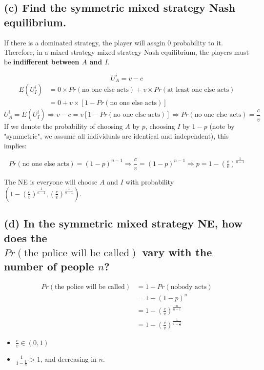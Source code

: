 \documentclass{article}
\begin{document}
\subsection*{(c) Find the symmetric mixed strategy Nash equilibrium.}

\begin{mdframed}[backgroundcolor=blue!20,linecolor=white]
If there is a dominated strategy, the player will assgin 0 probability to it. Therefore, in a mixed strategy mixed strategy Nash equilibrium, the players must be \textbf{indifferent between $A$ and $I$}.
\end{mdframed}

$$U^i_A = v-c$$
\begin{align*}
E(U^i_I) &= 0 \times Pr(\text{no one else acts}) + v \times  Pr(\text{at least one else acts}) \\
&= 0 + v \times [1- Pr(\text{no one else acts})]
\end{align*}
$$U^i_A = E(U^i_I) \Rightarrow v-c = v [1- Pr(\text{no one else acts})]\Rightarrow Pr(\text{no one else acts}) = \frac{c}{v}$$
If we denote the probability of choosing $A$ by $p$, choosing $I$ by $1-p$ (note by "symmetric", we assume all individuals are identical and independent), 
this implies:

$$Pr(\text{no one else acts}) = (1-p)^{n-1} \Rightarrow \frac{c}{v}= (1-p)^{n-1} \Rightarrow  p = 1 - \left( \tfrac{c}{v} \right)^\frac1{n-1}$$ 

The NE is everyone will choose $A$ and $I$ with probability $(1 - \left( \tfrac{c}{v} \right)^\frac1{n-1},\left( \tfrac{c}{v} \right)^\frac1{n-1})$.

\subsection*{(d) In the symmetric mixed strategy NE, how does the \\ $Pr(\text{the police  will  be  called})$ vary with the number of people $n$?}  

\begin{align*}
Pr(\text{the police  will  be  called}) &= 1 - Pr(\text{nobody acts})  \\
&= 1- (1-p)^n \\
&= 1- \left( \tfrac{c}{v} \right)^\frac n{n-1} \\
&= 1- \left( \tfrac{c}{v} \right)^\frac 1{1-\tfrac 1n}
\end{align*}

\begin{itemize}
\item $\tfrac{c}{v} \in (0,1)$
\item $\frac 1{1-\tfrac 1n} > 1$, and decreasing in $n$.
\end{itemize}
\end{document}

